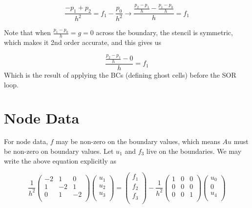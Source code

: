 \documentclass[11pt]{article}
\begin{document}
\begin{equation}
\frac{-p_1+p_2}{h^2} = f_1 - \frac{p_0}{h^2}
\rightarrow
\frac{\frac{p_2-p_1}{h} - \frac{p_1-p_0}{h}}{h} = f_1
\end{equation}

Note that when $\frac{p_1-p_0}{h} = g = 0$ across the boundary, the stencil is symmetric, which makes it 2nd order accurate, and this gives us

\begin{equation}
\frac{\frac{p_2-p_1}{h} - 0}{h} = f_1
\end{equation}
Which is the result of applying the BCs (defining ghost cells) before the SOR loop.

\section{Node Data}
For node data, $f$ may be non-zero on the boundary values, which means $Au$ must be non-zero on boundary values. Let $u_1$ and $f_3$ live on the boundaries. We may write the above equation explicitly as

\begin{equation}
\frac{1}{h^2}
 \begin{pmatrix}
  -2 &  1 &  0 \\
   1 & -2 &  1 \\
   0 &  1 & -2 \\
 \end{pmatrix}
 \begin{pmatrix}
  u_1 \\  u_2 \\  u_3 \\
 \end{pmatrix}
  =
 \begin{pmatrix}
  f_1 \\  f_2 \\  f_3 \\
 \end{pmatrix}
   -
\frac{1}{h^2}
 \begin{pmatrix}
   1 &  0 &  0 \\
   0 &  0 &  0 \\
   0 &  0 &  1 \\
 \end{pmatrix}
 \begin{pmatrix}
  u_0 \\
  0 \\
  u_4 \\
 \end{pmatrix}
\end{equation}
\end{document}
